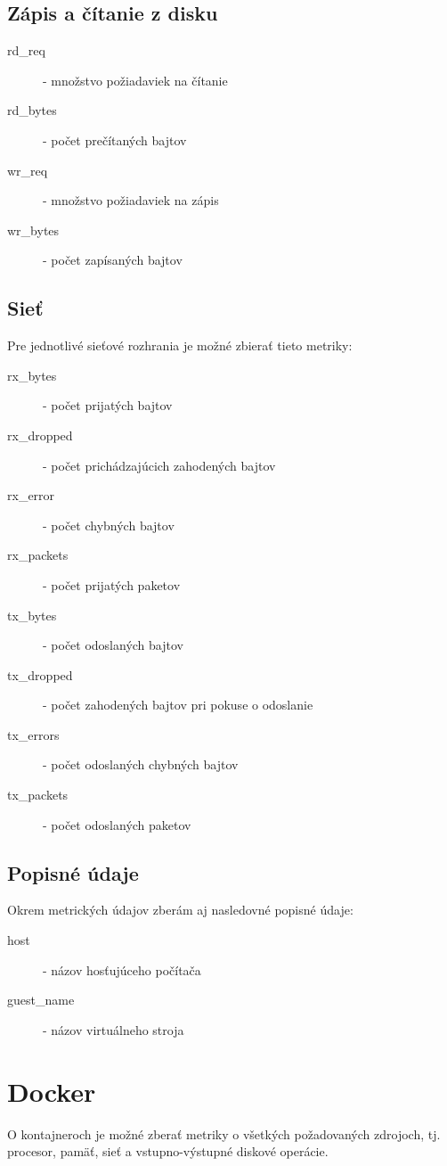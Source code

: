 \documentclass[12pt,twoside,color,cover,table]{fithesis3}
\begin{document}
\subsection{Zápis a čítanie z disku}
\begin{description}
\item[rd\_req] - množstvo požiadaviek na čítanie
\item[rd\_bytes] - počet prečítaných bajtov
\item[wr\_req] - množstvo požiadaviek na zápis
\item[wr\_bytes] - počet zapísaných bajtov
\end{description}

\subsection{Sieť}
Pre jednotlivé sieťové rozhrania je možné zbierať tieto metriky:
\begin{description}
\item[rx\_bytes] - počet prijatých bajtov
\item[rx\_dropped] - počet prichádzajúcich zahodených bajtov
\item[rx\_error] - počet chybných bajtov
\item[rx\_packets] - počet prijatých paketov
\item[tx\_bytes] - počet odoslaných bajtov
\item[tx\_dropped] - počet zahodených bajtov pri pokuse o odoslanie
\item[tx\_errors] - počet odoslaných chybných bajtov
\item[tx\_packets] - počet odoslaných paketov
\end{description}

\subsection{Popisné údaje}
Okrem metrických údajov zberám aj nasledovné popisné údaje:
\begin{description}
\item[host] - názov hosťujúceho počítača
\item[guest\_name] - názov virtuálneho stroja
\end{description}

\section{Docker}
O kontajneroch je možné zberať metriky o všetkých požadovaných zdrojoch, tj. procesor, pamäť, sieť a vstupno-výstupné diskové operácie.
\end{document}
